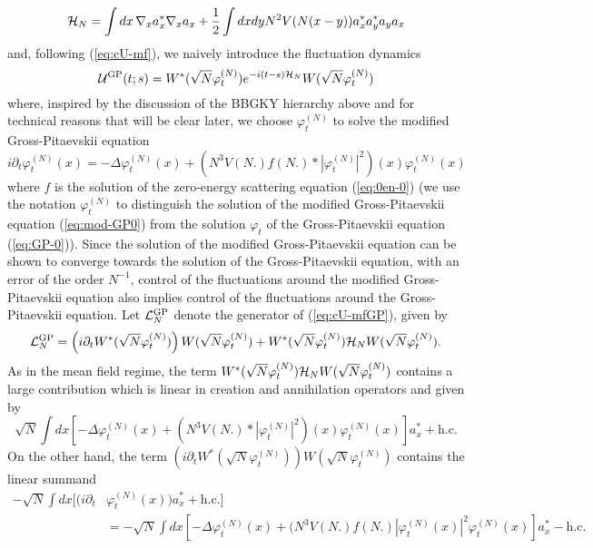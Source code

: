 \documentclass[11pt,a4paper]{article}
\newcommand{\cU}{{\cal U}}
\newcommand{\cH}{{\cal H}}
\newcommand{\cL}{{\cal L}}
\begin{document}
\begin{equation}\label{eq:cHN} \cH_N = \int dx \, \nabla_x a_x^* \nabla_x a_x + \frac{1}{2} \int dx dy N^2 V(N (x-y)) a_x^* a_y^* a_y a_x \end{equation}
and, following (\ref{eq:cU-mf}), we naively introduce the fluctuation dynamics
\begin{equation}\label{eq:cU-mfGP} 
\cU^{\text{GP}} (t;s) = W^* (\sqrt{N} \varphi^{(N)}_t) e^{-i (t-s) \cH_N} W(\sqrt{N} \varphi^{(N)}_t) \end{equation}
where, inspired by the discussion of the BBGKY hierarchy above and for technical reasons that will be clear later, we choose $\varphi^{(N)}_t$ to solve the modified Gross-Pitaevskii equation 
\begin{equation}\label{eq:mod-GP0} i\partial_t \varphi^{(N)}_t (x) = -\Delta \varphi^{(N)}_t (x) + (N^3 V(N.) f(N.) * |\varphi^{(N)}_t|^2) (x) \varphi^{(N)}_t (x) \end{equation}
where $f$ is the solution of the zero-energy scattering equation (\ref{eq:0en-0}) (we use the notation $\varphi_t^{(N)}$ to distinguish the solution of the modified Gross-Pitaevskii equation (\ref{eq:mod-GP0}) from the solution $\varphi_t$ of the Gross-Pitaevskii equation (\ref{eq:GP-0})). Since the solution of the modified Gross-Pitaevskii equation can be shown to converge towards the solution of the Gross-Pitaevskii equation, with an error of the order $N^{-1}$, control of the fluctuations around the modified Gross-Pitaevskii equation also implies control of the fluctuations around the Gross-Pitaevskii equation. Let $\cL_N^{\text{GP}}$ denote the generator of (\ref{eq:cU-mfGP}), given by
\begin{equation}\label{eq:lalelGP}
 \cL_N^{\text{GP}} = \left(i\partial_t W^* (\sqrt{N} \varphi^{(N)}_t)\right) W (\sqrt{N} \varphi^{(N)}_t) + W^* (\sqrt{N} \varphi^{(N)}_t) \cH_N W (\sqrt{N} \varphi^{(N)}_t).
\end{equation}
As in the mean field regime, the term $W^*(\sqrt{N} \varphi^{(N)}_t) \cH_N W(\sqrt{N} \varphi^{(N)}_t)$ contains a large contribution which is linear in creation and annihilation operators and given by
\[ \sqrt{N} \int dx \left[ -\Delta \varphi^{(N)}_t (x) + (N^3 V (N.) * |\varphi^{(N)}_t|^2) (x) \varphi^{(N)}_t (x) \right] a_x^* + \text{h.c.} \] 
On the other hand, the term $\left(i\partial_t W^* (\sqrt{N} \varphi^{(N)}_t)\right) W (\sqrt{N} \varphi^{(N)}_t)$ contains the linear summand
\[ \begin{split} 
- \sqrt{N} \int dx \big[ (i\partial_t &\varphi^{(N)}_t (x)) a_x^* + \text{h.c.}\big]  \\
&=- \sqrt{N} \int dx \left[ -\Delta \varphi^{(N)}_t (x) + (N^3 V(N.) f(N.) |\varphi^{(N)}_t (x)|^2 \varphi^{(N)}_t (x) \right] a_x^* - \text{h.c.}
\end{split}\]
\end{document}
